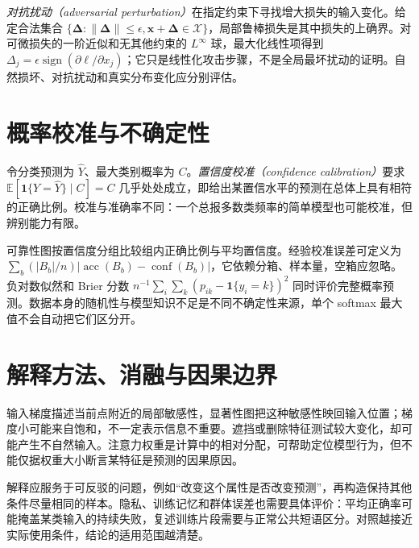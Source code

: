 \emph{对抗扰动（adversarial perturbation）}在指定约束下寻找增大损失的输入变化。给定合法集合 $\{\boldsymbol\Delta:\|\boldsymbol\Delta\|\leq\epsilon,\mathbf x+\boldsymbol\Delta\in\mathcal X\}$，局部鲁棒损失是其中损失的上确界。对可微损失的一阶近似和无其他约束的 $L^\infty$ 球，最大化线性项得到 $\Delta_j=\epsilon\operatorname{sign}(\partial\ell/\partial x_j)$；它只是线性化攻击步骤，不是全局最坏扰动的证明。自然损坏、对抗扰动和真实分布变化应分别评估。

\section{概率校准与不确定性}
令分类预测为 $\widehat Y$、最大类别概率为 $C$。\emph{置信度校准（confidence calibration）}要求 $\mathbb E[\mathbf1\{Y=\widehat Y\}\mid C]=C$ 几乎处处成立，即给出某置信水平的预测在总体上具有相符的正确比例。校准与准确率不同：一个总报多数类频率的简单模型也可能校准，但辨别能力有限。

可靠性图按置信度分组比较组内正确比例与平均置信度。经验校准误差可定义为 $\sum_b(|B_b|/n)|\operatorname{acc}(B_b)-\operatorname{conf}(B_b)|$，它依赖分箱、样本量，空箱应忽略。负对数似然和 Brier 分数 $n^{-1}\sum_i\sum_k(p_{ik}-\mathbf1\{y_i=k\})^2$ 同时评价完整概率预测。数据本身的随机性与模型知识不足是不同不确定性来源，单个 softmax 最大值不会自动把它们区分开。

\section{解释方法、消融与因果边界}
输入梯度描述当前点附近的局部敏感性，显著性图把这种敏感性映回输入位置；梯度小可能来自饱和，不一定表示信息不重要。遮挡或删除特征测试较大变化，却可能产生不自然输入。注意力权重是计算中的相对分配，可帮助定位模型行为，但不能仅据权重大小断言某特征是预测的因果原因。

解释应服务于可反驳的问题，例如“改变这个属性是否改变预测”，再构造保持其他条件尽量相同的样本。隐私、训练记忆和群体误差也需要具体评价：平均正确率可能掩盖某类输入的持续失败，复述训练片段需要与正常公共短语区分。对照越接近实际使用条件，结论的适用范围越清楚。

